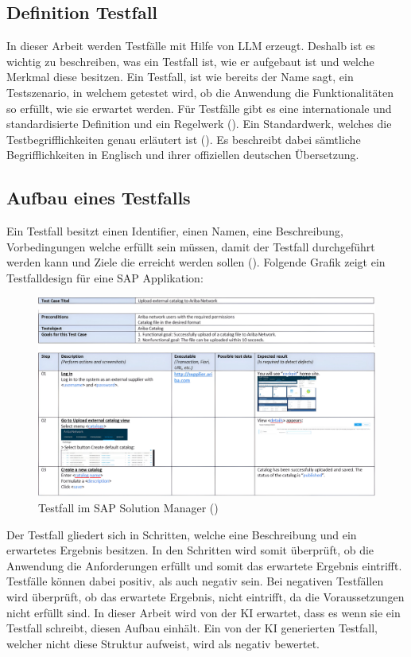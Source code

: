 \documentclass[12pt,toc=bib,toc=listof]{scrreprt}
\begin{document}
\subsection{Definition Testfall} %
\label{sec:definitionTestfall}
In dieser Arbeit werden Testfälle mit Hilfe von LLM erzeugt. Deshalb ist es wichtig zu beschreiben, was ein Testfall ist, wie er aufgebaut ist und welche Merkmal diese besitzen. Ein Testfall, ist wie bereits der Name sagt, ein Testszenario, in welchem getestet wird, ob die Anwendung die Funktionalitäten so erfüllt, wie sie erwartet werden. Für Testfälle gibt es eine internationale und standardisierte Definition und ein Regelwerk (\cite{IsoIecIeee2024}). Ein Standardwerk, welches die Testbegrifflichkeiten genau erläutert ist (\cite{Istqb2017}). Es beschreibt dabei sämtliche Begrifflichkeiten in Englisch und ihrer offiziellen deutschen Übersetzung.

\subsection{Aufbau eines Testfalls} %
\label{sec:aufbauEinesTestfalls}
Ein Testfall besitzt einen Identifier, einen Namen, eine Beschreibung, Vorbedingungen welche erfüllt sein müssen, damit der Testfall durchgeführt werden kann und Ziele die erreicht werden sollen (\cite{IsoIecIeee2024}). Folgende Grafik zeigt ein Testfalldesign für eine SAP Applikation:

\begin{figure} [H]
    \centering
    \includegraphics[width=1\linewidth]{./Bilder/Enderli_Testfall im SAP Solution Manager.jpeg}
    \caption{Testfall im SAP Solution Manager (\cite{Enderli2019})}
    \label{fig:enter-label}
\end{figure}
\noindent Der Testfall gliedert sich in Schritten, welche eine Beschreibung und ein erwartetes Ergebnis besitzen. In den Schritten wird somit überprüft, ob die Anwendung die Anforderungen erfüllt und somit das erwartete Ergebnis eintrifft. Testfälle können dabei positiv, als auch negativ sein. Bei negativen Testfällen wird überprüft, ob das erwartete Ergebnis, nicht eintrifft, da die Voraussetzungen nicht erfüllt sind. In dieser Arbeit wird von der KI erwartet, dass es wenn sie ein Testfall schreibt, diesen Aufbau einhält. Ein von der KI generierten Testfall, welcher nicht diese Struktur aufweist, wird als negativ bewertet.
\end{document}
